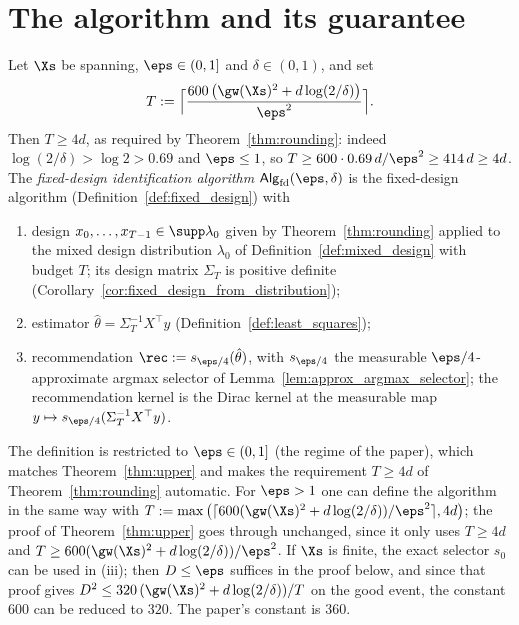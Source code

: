 \section{The algorithm and its guarantee}
\label{sec:upper_theorem}

\begin{definition}\label{def:fixed_design_algorithm}
\leanok
{}
Let $\Xs$ be spanning, $\eps \in (0,1]$ and $\delta \in (0,1)$, and set
\[
  T := \Big\lceil \frac{600\,\big(\gw(\Xs)^2 + d\log(2/\delta)\big)}{\eps^2} \Big\rceil .
\]
Then $T \ge 4d$, as required by Theorem~\ref{thm:rounding}: indeed $\log(2/\delta) > \log 2 > 0.69$
and $\eps \le 1$, so $T \ge 600\cdot0.69\,d/\eps^2 \ge 414\,d \ge 4d$.
The \emph{fixed-design identification algorithm} $\mathsf{Alg}_{\mathrm{fd}}(\eps,\delta)$
is the fixed-design algorithm (Definition~\ref{def:fixed_design}) with
\begin{enumerate}
  \item[(i)] design $x_0,\dots,x_{T-1} \in \supp\lambda_0$ given by Theorem~\ref{thm:rounding}
        applied to the mixed design distribution $\lambda_0$ of Definition~\ref{def:mixed_design}
        with budget $T$; its design matrix $\Sigma_T$ is positive definite
        (Corollary~\ref{cor:fixed_design_from_distribution});
  \item[(ii)] estimator $\hat\theta = \Sigma_T^{-1}X^\top y$ (Definition~\ref{def:least_squares});
  \item[(iii)] recommendation $\rec := s_{\eps/4}(\hat\theta)$, with $s_{\eps/4}$ the measurable
        $\eps/4$-approximate argmax selector of Lemma~\ref{lem:approx_argmax_selector}; the
        recommendation kernel is the Dirac kernel at the measurable map $y \mapsto
        s_{\eps/4}(\Sigma_T^{-1}X^\top y)$.
\end{enumerate}
\end{definition}

\begin{remark}\label{rem:upper_eps_range}
The definition is restricted to $\eps \in (0,1]$ (the regime of the paper), which matches
Theorem~\ref{thm:upper} and makes the requirement $T \ge 4d$ of Theorem~\ref{thm:rounding}
automatic. For $\eps > 1$ one can define the algorithm in the same way with
$T := \max\big(\lceil 600(\gw(\Xs)^2 + d\log(2/\delta))/\eps^2\rceil, 4d\big)$; the proof of
Theorem~\ref{thm:upper} goes through unchanged, since it only uses $T \ge 4d$ and
$T \ge 600(\gw(\Xs)^2 + d\log(2/\delta))/\eps^2$. If $\Xs$ is finite, the exact selector $s_0$
can be used in (iii); then $D \le \eps$ suffices in the proof below, and since that proof gives
$D^2 \le 320\,(\gw(\Xs)^2 + d\log(2/\delta))/T$ on the good event, the constant $600$ can be
reduced to $320$. The paper's constant is $360$.
\end{remark}


